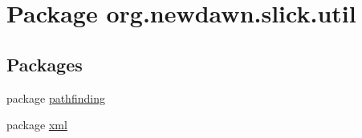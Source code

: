 \hypertarget{namespaceorg_1_1newdawn_1_1slick_1_1util}{}\section{Package org.\+newdawn.\+slick.\+util}
\label{namespaceorg_1_1newdawn_1_1slick_1_1util}
\subsection*{Packages}
\begin{DoxyCompactItemize}
\item 
package \mbox{\hyperlink{namespaceorg_1_1newdawn_1_1slick_1_1util_1_1pathfinding}{pathfinding}}
\item 
package \mbox{\hyperlink{namespaceorg_1_1newdawn_1_1slick_1_1util_1_1xml}{xml}}
\end{DoxyCompactItemize}
